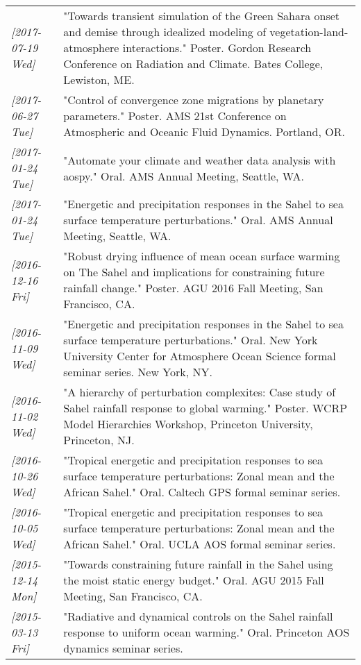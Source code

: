\documentclass[12pt,letterpaper]{shillcv}
\begin{document}
\begin{center}
\begin{tabularx}{\textwidth}{lX}
\textit{[2017-07-19 Wed]} & "Towards transient simulation of the Green Sahara onset and demise through idealized modeling of vegetation-land-atmosphere interactions."  Poster.  Gordon Research Conference on Radiation and Climate.  Bates College, Lewiston, ME.\\
\textit{[2017-06-27 Tue]} & "Control of convergence zone migrations by planetary parameters."  Poster.  AMS 21st Conference on Atmospheric and Oceanic Fluid Dynamics.  Portland, OR.\\
\textit{[2017-01-24 Tue]} & "Automate your climate and weather data analysis with aospy."  Oral.  AMS Annual Meeting, Seattle, WA.\\
\textit{[2017-01-24 Tue]} & "Energetic and precipitation responses in the Sahel to sea surface temperature perturbations."  Oral.  AMS Annual Meeting, Seattle, WA.\\
\textit{[2016-12-16 Fri]} & "Robust drying influence of mean ocean surface warming on The Sahel and implications for constraining future rainfall change."  Poster.  AGU 2016 Fall Meeting, San Francisco, CA.\\
\textit{[2016-11-09 Wed]} & "Energetic and precipitation responses in the Sahel to sea surface temperature perturbations."  Oral.  New York University Center for Atmosphere Ocean Science formal seminar series.  New York, NY.\\
\textit{[2016-11-02 Wed]} & "A hierarchy of perturbation complexites: Case study of Sahel rainfall response to global warming."  Poster.  WCRP Model Hierarchies Workshop, Princeton University, Princeton, NJ.\\
\textit{[2016-10-26 Wed]} & "Tropical energetic and precipitation responses to sea surface temperature perturbations: Zonal mean and the African Sahel."  Oral.  Caltech GPS formal seminar series.\\
\textit{[2016-10-05 Wed]} & "Tropical energetic and precipitation responses to sea surface temperature perturbations: Zonal mean and the African Sahel."  Oral.  UCLA AOS formal seminar series.\\
\textit{[2015-12-14 Mon]} & "Towards constraining future rainfall in the Sahel using the moist static energy budget." Oral.  AGU 2015 Fall Meeting, San Francisco, CA.\\
\textit{[2015-03-13 Fri]} & "Radiative and dynamical controls on the Sahel rainfall response to uniform ocean warming."  Oral.  Princeton AOS dynamics seminar series.\\

\end{tabularx}
\end{center}
\end{document}
